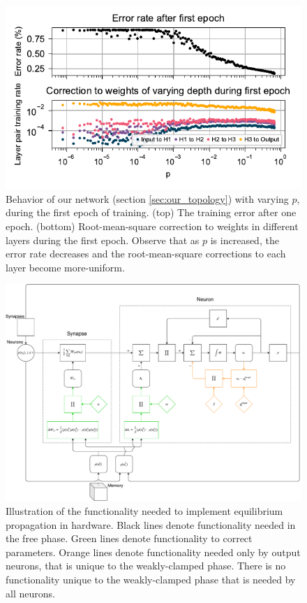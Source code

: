 \documentclass[utf8]{frontiersSCNS}
\begin{document}
\begin{figure}[h!]
\begin{center}
\includegraphics[width=\textwidth]{figures/MNIST_one_epoch_performance.pdf}
\end{center}
\caption{Behavior of our network (section \ref{sec:our_topology}) with varying $p$, during the first epoch of training. (top) The training error after one epoch. (bottom) Root-mean-square correction to weights in different layers during the first epoch. Observe that as $p$ is increased, the error rate decreases and the root-mean-square corrections to each layer become more-uniform.} \label{fig:mnist_1epoch}
\end{figure}
\begin{figure}[h!]
\begin{center}
\includegraphics[width=\textwidth]{figures/eqp_bd.pdf}
\end{center}
\caption{Illustration of the functionality needed to implement equilibrium propagation in hardware. Black lines denote functionality needed in the free phase. Green lines denote functionality to correct parameters. Orange lines denote functionality needed only by output neurons, that is unique to the weakly-clamped phase. There is no functionality unique to the weakly-clamped phase that is needed by all neurons.} \label{fig:eqp_bd}
\end{figure}
\end{document}
